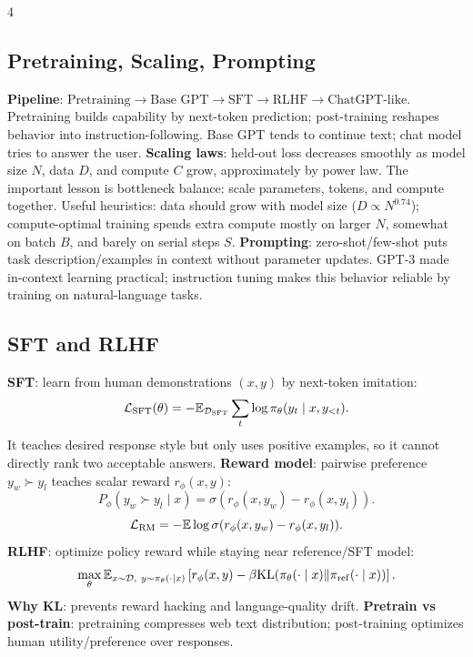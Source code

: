 \documentclass{article}
\newcommand{\key}[1]{\textbf{#1}}
\newcommand{\E}{\mathbb{E}}
\newcommand{\KL}{\mathrm{KL}}
\newcommand{\1}{\mathbf 1}
\begin{document}
\begin{multicols*}{4}
\subsection{Pretraining, Scaling, Prompting}
\key{Pipeline}: $\text{Pretraining}\to\text{Base GPT}\to\text{SFT}\to\text{RLHF}\to\text{ChatGPT-like}$. Pretraining builds capability by next-token prediction; post-training reshapes behavior into instruction-following. Base GPT tends to continue text; chat model tries to answer the user.
\key{Scaling laws}: held-out loss decreases smoothly as model size $N$, data $D$, and compute $C$ grow, approximately by power law. The important lesson is bottleneck balance: scale parameters, tokens, and compute together. Useful heuristics: data should grow with model size ($D\propto N^{0.74}$); compute-optimal training spends extra compute mostly on larger $N$, somewhat on batch $B$, and barely on serial steps $S$.
\key{Prompting}: zero-shot/few-shot puts task description/examples in context without parameter updates. GPT-3 made in-context learning practical; instruction tuning makes this behavior reliable by training on natural-language tasks.

\subsection{SFT and RLHF}
\key{SFT}: learn from human demonstrations $(x,y)$ by next-token imitation:
\[
\mathcal L_{\rm SFT}(\theta)
=-\E_{\mathcal D_{\rm SFT}}\sum_t\log\pi_\theta(y_t\mid x,y_{<t}).
\]
It teaches desired response style but only uses positive examples, so it cannot directly rank two acceptable answers. \key{Reward model}: pairwise preference $y_w\succ y_l$ teaches scalar reward $r_\phi(x,y)$:
\[
P_\phi(y_w\succ y_l\mid x)=\sigma(r_\phi(x,y_w)-r_\phi(x,y_l)).
\]
\[
\mathcal L_{\rm RM}=-\E\log\sigma(r_\phi(x,y_w)-r_\phi(x,y_l)).
\]
\key{RLHF}: optimize policy reward while staying near reference/SFT model:
\[
\max_\theta\E_{x\sim\mathcal D,\ y\sim\pi_\theta(\cdot\mid x)}
\left[r_\phi(x,y)-\beta\KL(\pi_\theta(\cdot\mid x)\|\pi_{\rm ref}(\cdot\mid x))\right].
\]
\key{Why KL}: prevents reward hacking and language-quality drift. \key{Pretrain vs post-train}: pretraining compresses web text distribution; post-training optimizes human utility/preference over responses.


\end{multicols*}
\end{document}

